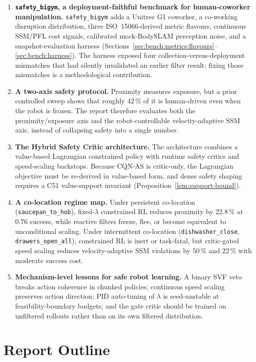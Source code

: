 \documentclass[11pt,a4paper]{report}
\newcommand{\ssm}{SSM}
\newcommand{\pfl}{PFL}
\newcommand{\iso}{ISO~15066}
\newcommand{\sbigym}{\texttt{safety\_bigym}}
\newcommand{\cqnas}{CQN-AS}
\newcommand{\bodyslampp}{BodySLAM\nolinebreak[4]\hspace{-.05em}\raisebox{.2ex}{\scriptsize ++}}
\begin{document}
\begin{enumerate}[label=\textbf{C\arabic*.}, leftmargin=2em]
\item \textbf{\sbigym{}, a deployment-faithful benchmark for
human-coworker manipulation.} \sbigym{} adds a Unitree G1 coworker, a
co-working disruption distribution, three \iso{}-derived metric
flavours, continuous \ssm{}/\pfl{} cost signals, calibrated
mock-\bodyslampp{} perception noise, and a snapshot-evaluation harness
(Sections~\ref{sec:bench:metrics:flavours}--\ref{sec:bench:harness}).
The harness exposed four collection-versus-deployment mismatches that
had silently invalidated an earlier filter result; fixing those
mismatches is a methodological contribution.
\item \textbf{A two-axis safety protocol.} Proximity measures exposure,
but a prior controlled sweep shows that roughly $42\,\%$ of it is
human-driven even when the robot is frozen. The report therefore
evaluates both the proximity/exposure axis and the robot-controllable
velocity-adaptive \ssm{} axis, instead of collapsing safety into a
single number.
\item \textbf{The Hybrid Safety Critic architecture.} The architecture
combines a value-based Lagrangian constrained policy with runtime
safety critics and speed-scaling backstops. Because \cqnas{} is
critic-only, the Lagrangian objective must be re-derived in
value-based form, and dense safety shaping requires a C51 value-support
invariant (Proposition~\ref{lem:support-bound}).
\item \textbf{A co-location regime map.} Under persistent co-location
(\texttt{saucepan\_to\_hob}), fixed-$\lambda$ constrained RL reduces
proximity by $22.8\,\%$ at $0.76$ success, while reactive filters
freeze, flee, or become equivalent to unconditional scaling. Under
intermittent co-location (\texttt{dishwasher\_close},
\texttt{drawers\_open\_all}), constrained RL is inert or task-fatal,
but critic-gated speed scaling reduces velocity-adaptive \ssm{}
violations by $50\,\%$ and $22\,\%$ with moderate success cost.
\item \textbf{Mechanism-level lessons for safe robot learning.} A
binary SVF veto breaks action coherence in chunked policies; continuous
speed scaling preserves action direction; PID auto-tuning of
$\lambda$ is seed-unstable at feasibility-boundary budgets; and the
gate critic should be trained on unfiltered rollouts rather than on
its own filtered distribution.
\end{enumerate}

\section{Report Outline}
\label{sec:intro:outline}
\end{document}
